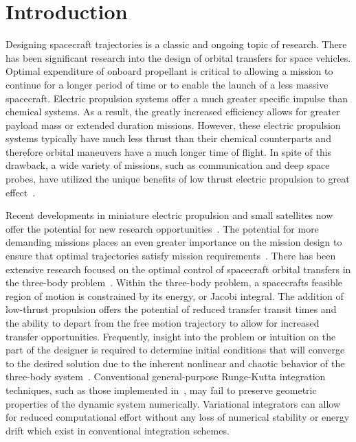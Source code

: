\documentclass[smallcondensed]{svjour3}
\begin{document}
\section{Introduction}\label{sec:introduction}



Designing spacecraft trajectories is a classic and ongoing topic of research.
There has been significant research into the design of orbital transfers for space vehicles.
Optimal expenditure of onboard propellant is critical to allowing a mission to continue for a longer period of time or to enable the launch of a less massive spacecraft.
Electric propulsion systems offer a much greater specific impulse than chemical systems.
As a result, the greatly increased efficiency allows for greater payload mass or extended duration missions.
However, these electric propulsion systems typically have much less thrust than their chemical counterparts and therefore orbital maneuvers have a much longer time of flight.
In spite of this drawback, a wide variety of missions, such as communication and deep space probes, have utilized the unique benefits of low thrust electric propulsion to great effect~\cite{choueiri2009}.

Recent developments in miniature electric propulsion and small satellites now offer the potential for new research opportunities~\cite{folta2015,haque2013}.
The potential for more demanding missions places an even greater importance on the mission design to ensure that optimal trajectories satisfy mission requirements~\cite{folta2015,koon2011,ross2006,gomez2001}. 
There has been extensive research focused on the optimal control of spacecraft orbital transfers in the three-body problem~\cite{mingotti2011,grebow2011,koon2011,ross2006}. 
Within the three-body problem, a spacecrafts feasible region of motion is constrained by its energy, or Jacobi integral.
The addition of low-thrust propulsion offers the potential of reduced transfer transit times and the ability to depart from the free motion trajectory to allow for increased transfer opportunities.
Frequently, insight into the problem or intuition on the part of the designer is required to determine initial conditions that will converge to the desired solution due to the inherent nonlinear and chaotic behavior of the three-body system~\cite{szebehely1967}.
Conventional general-purpose Runge-Kutta integration techniques, such as those implemented in~\cite{mingotti2011,grebow2011}, may fail to preserve geometric properties of the dynamic system numerically. 
Variational integrators can allow for reduced computational effort without any loss of numerical stability or energy drift which exist in conventional integration schemes. 
\end{document}
